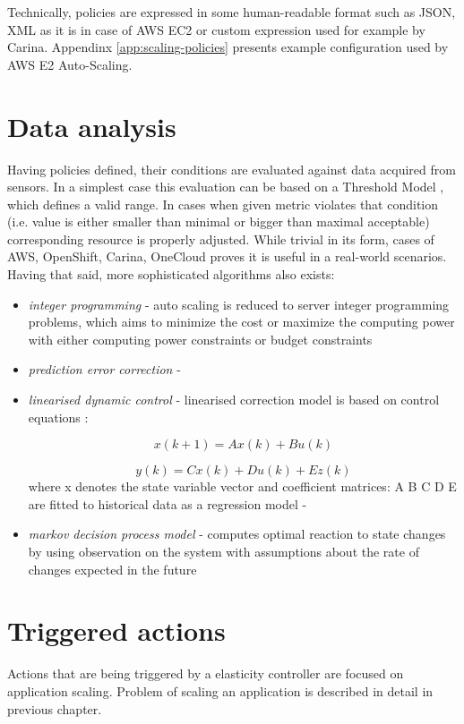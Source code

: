 Technically, policies are expressed in some human-readable format such as JSON, XML as it is in case of AWS EC2 or custom expression used for example by Carina. Appendinx \ref{app:scaling-policies} presents example configuration used by AWS E2 Auto-Scaling.

\section{Data analysis}
Having policies defined, their conditions are evaluated against data acquired from sensors. In a simplest case this evaluation can be based on a Threshold Model \cite{LiWoZh05}, which defines a valid range. In cases when given metric violates that condition (i.e. value is either smaller than minimal or bigger than maximal acceptable) corresponding resource is properly adjusted. While trivial in its form, cases of AWS, OpenShift, Carina, OneCloud proves it is useful in a real-world scenarios. Having that said, more sophisticated algorithms also exists:
\begin{itemize}
  \item \textit{integer programming} - auto scaling is reduced to server integer programming problems, which aims to minimize the cost or maximize the computing power with either computing power constraints or
budget constraints \cite{MaLiHu10}
  \item \textit{prediction error correction} - \cite{ShSuGuWi11}
  \item \textit{linearised dynamic control} - linearised correction model is based on control equations \cite{AbShBh02}:
  
    \begin{equation}
      x(k+1)=Ax(k)+Bu(k)
    \end{equation}
    
    \begin{equation}
       y(k) = C x(k) + D u(k) + E z(k)
    \end{equation}
    where x denotes the state variable vector and coefficient matrices: A B C D E are fitted to historical data as a regression model - \cite{DiLuFrHePa03}

  \item \textit{markov decision process model} - computes optimal reaction to state changes by using observation on the system with assumptions about the rate of changes expected in the future \cite{AbWo02}
\end{itemize}

\section{Triggered actions}
Actions that are being triggered by a elasticity controller are focused on application scaling. Problem of scaling an application is described in detail in previous chapter.

